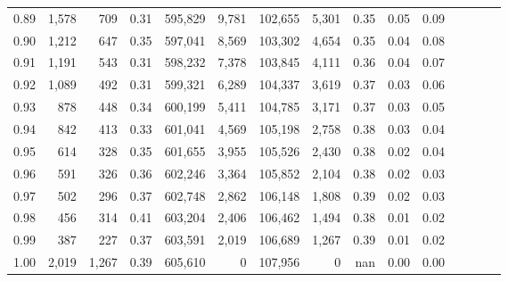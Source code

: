 \begin{tabular}{rrrcrrrrrrrrrrr}
0.89 &   1,578 &    709 &                                       0.31 &  595,829 &    9,781 &  102,655 &    5,301 &  0.35 &  0.05 &                         0.09 \\
0.90 &   1,212 &    647 &                                       0.35 &  597,041 &    8,569 &  103,302 &    4,654 &  0.35 &  0.04 &                         0.08 \\
0.91 &   1,191 &    543 &                                       0.31 &  598,232 &    7,378 &  103,845 &    4,111 &  0.36 &  0.04 &                         0.07 \\
0.92 &   1,089 &    492 &                                       0.31 &  599,321 &    6,289 &  104,337 &    3,619 &  0.37 &  0.03 &                         0.06 \\
0.93 &     878 &    448 &                                       0.34 &  600,199 &    5,411 &  104,785 &    3,171 &  0.37 &  0.03 &                         0.05 \\
0.94 &     842 &    413 &                                       0.33 &  601,041 &    4,569 &  105,198 &    2,758 &  0.38 &  0.03 &                         0.04 \\
0.95 &     614 &    328 &                                       0.35 &  601,655 &    3,955 &  105,526 &    2,430 &  0.38 &  0.02 &                         0.04 \\
0.96 &     591 &    326 &                                       0.36 &  602,246 &    3,364 &  105,852 &    2,104 &  0.38 &  0.02 &                         0.03 \\
0.97 &     502 &    296 &                                       0.37 &  602,748 &    2,862 &  106,148 &    1,808 &  0.39 &  0.02 &                         0.03 \\
0.98 &     456 &    314 &                                       0.41 &  603,204 &    2,406 &  106,462 &    1,494 &  0.38 &  0.01 &                         0.02 \\
0.99 &     387 &    227 &                                       0.37 &  603,591 &    2,019 &  106,689 &    1,267 &  0.39 &  0.01 &                         0.02 \\
1.00 &   2,019 &  1,267 &                                       0.39 &  605,610 &        0 &  107,956 &        0 &   nan &  0.00 &                         0.00 \\
\bottomrule
\end{tabular}
